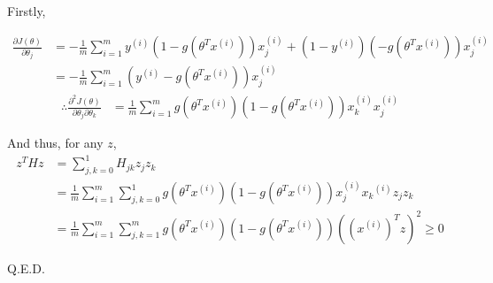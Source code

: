 \begin{answer}
    Firstly,

$$
	\begin{aligned}
\frac{\partial J(\theta)}{\partial \theta_j} &= -\frac{1}{m}\sum_{i=1}^m y^{(i)} (1-g(\theta^T x^{(i)}))x^{(i)}_j + (1-y^{(i)}) (-g(\theta^T x^{(i)})) x^{(i)}_j \\
    &=  -\frac{1}{m}\sum_{i=1}^m (y^{(i)}-g(\theta^T x^{(i)})) x^{(i)}_j
	\end{aligned}
$$
$$
	\begin{aligned}
\therefore	
\frac{\partial^2 J(\theta)}{\partial \theta_j \partial \theta_k} 
    &=  \frac{1}{m}\sum_{i=1}^m g(\theta^T x^{(i)})(1-g(\theta^T x^{(i)})) x^{(i)}_k x^{(i)}_j
	\end{aligned}
$$
	
And thus, for any $z$, 
$$
    \begin{aligned}
z^THz &= \sum_{j, k=0}^1 H_{jk}z_j z_k\\ 
		&= \frac{1}{m}\sum_{i=1}^m \sum_{j, k=0}^1 g(\theta^Tx^{(i)})(1 - g(\theta^Tx^{(i)}))x_j^{(i)}x_k{^{(i)}} z_j z_k\\
        &= \frac{1}{m}\sum_{i=1}^m \sum_{j, k=1}^mg(\theta^Tx^{(i)})(1 - g(\theta^Tx^{(i)}))((x^{(i)})^Tz)^2 \ge 0
    \end{aligned}
$$

Q.E.D.
\end{answer}

